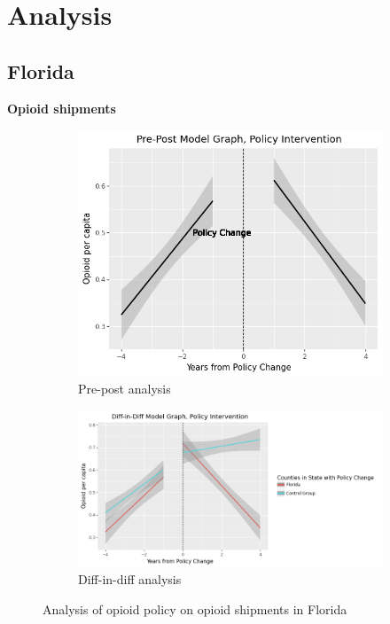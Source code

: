 \documentclass[12pt,letterpaper]{article}
\begin{document}
\section{Analysis}
\subsection{Florida}

\textbf{Opioid shipments}

\begin{figure}[!h]
\centering
\begin{subfigure}{.5\textwidth}
  \centering
  \includegraphics[width=.7\linewidth]{../30_results/General_Results/florida_opioid_shipment_prepost.png}
  \caption{Pre-post analysis}
  \label{fig:fl_ship_prepost}
\end{subfigure}%
\begin{subfigure}{.55\textwidth}
  \centering
  \includegraphics[width=1\linewidth]{../30_results/General_Results/florida_opioid_shipment_diffdiff.png}
  \caption{Diff-in-diff analysis}
  \label{fig:fl_ship_did}
\end{subfigure}
\caption{Analysis of opioid policy on opioid shipments in Florida}
\label{fig:fl_ship}
\end{figure}
\end{document}
